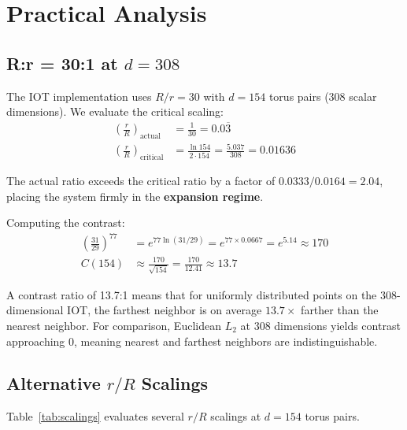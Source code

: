 \section{Practical Analysis}
\label{sec:practical}

\subsection{R:r = 30:1 at $d = 308$}

The IOT implementation uses $R/r = 30$ with $d = 154$ torus pairs (308 scalar dimensions). We evaluate the critical scaling:
\begin{align}
    \left(\frac{r}{R}\right)_{\text{actual}} &= \frac{1}{30} = 0.0\overline{3} \\[4pt]
    \left(\frac{r}{R}\right)_{\text{critical}} &= \frac{\ln 154}{2 \cdot 154} = \frac{5.037}{308} = 0.01636
\end{align}

The actual ratio exceeds the critical ratio by a factor of $0.0333 / 0.0164 = 2.04$, placing the system firmly in the \textbf{expansion regime}.

Computing the contrast:
\begin{align}
    \left(\frac{31}{29}\right)^{77} &= e^{77 \ln(31/29)} = e^{77 \times 0.0667} = e^{5.14} \approx 170 \\[4pt]
    C(154) &\approx \frac{170}{\sqrt{154}} = \frac{170}{12.41} \approx 13.7
\end{align}

\begin{remark}
A contrast ratio of 13.7:1 means that for uniformly distributed points on the 308-dimensional IOT, the farthest neighbor is on average $13.7\times$ farther than the nearest neighbor. For comparison, Euclidean $L_2$ at 308 dimensions yields contrast approaching 0, meaning nearest and farthest neighbors are indistinguishable.
\end{remark}

\subsection{Alternative $r/R$ Scalings}

Table~\ref{tab:scalings} evaluates several $r/R$ scalings at $d = 154$ torus pairs.

